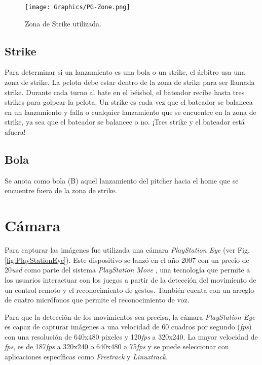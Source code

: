 \begin{figure}[!h]
    \centering
    \texttt{[image: Graphics/PG-Zone.png]}
    \caption{Zona de Strike utilizada.}
    \label{fig:UsedStrikeZone}
\end{figure}

\subsection{Strike}

Para determinar si un lanzamiento es una bola o un strike, el árbitro usa una zona de strike. La pelota debe estar dentro de la zona de strike para ser llamada strike. Durante cada turno al bate en el béisbol, el bateador recibe hasta tres strikes para golpear la pelota. Un strike es cada vez que el bateador se balancea en un lanzamiento y falla o cualquier lanzamiento que se encuentre en la zona de strike, ya sea que el bateador se balancee o no. ¡Tres strike y el bateador está afuera!

\subsection{Bola}

Se anota como bola (B) aquel lanzamiento del pitcher hacia el home que se encuentre fuera de la zona de strike.

\section{Cámara}

Para capturar las imágenes fue utilizada una cámara \textit{PlayStation Eye} \cite{PlayStationEye} (ver Fig. \ref{fig:PlayStationEye}). Este dispositivo se lanzó en el año 2007 con un precio de 20\textit{usd} como parte del sistema \textit{PlayStation Move} \cite{PlayStationMove}, una tecnología que permite a los usuarios interactuar con los juegos a partir de la detección del movimiento de un control remoto y el reconocimiento de gestos. También cuenta con un arreglo de cuatro micrófonos que permite el reconocimiento de voz.

Para que la detección de los movimientos sea precisa, la cámara \textit{PlayStation Eye} es capaz de capturar imágenes a una velocidad de 60 cuadros por segundo (\textit{fps}) con una resolución de 640x480 pixeles y 120\textit{fps} a 320x240. La mayor velocidad de \textit{fps}, es de 187\textit{fps} a 320x240 o 640x480 a 75\textit{fps} y se puede seleccionar con aplicaciones específicas como \textit{Freetrack} y \textit{Linuxtrack}. 

